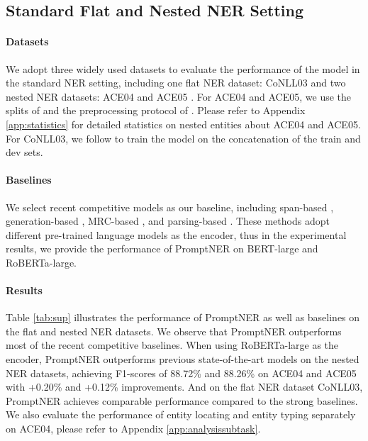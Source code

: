 \documentclass[11pt]{article}
\begin{document}
\subsection{Standard Flat and Nested NER Setting}
\label{flatnested}

\paragraph{Datasets} We adopt three widely used datasets to evaluate the performance of the model in the standard NER setting, including one flat NER dataset: CoNLL03 \citep{tjong-kim-sang-de-meulder-2003-introduction} and two nested NER datasets: ACE04 \citep{ doddington-etal-2004-automatic} and ACE05 \citep{2005-automatic}. For ACE04 and ACE05, we use the splits of \citet{lu-roth-2015-joint,muis-lu-2017-labeling} and the preprocessing protocol of \citet{shibuya-hovy-2020-nested}. Please refer to Appendix \ref{app:statistics} for detailed statistics on nested entities about ACE04 and ACE05. For CoNLL03, we follow \citet{lample-etal-2016-neural,yu-etal-2020-named, 10.1007/978-3-031-30675-4_31} to train the model on the concatenation of the train and dev sets.

\paragraph{Baselines} We select recent competitive models as our baseline, including span-based \citep{yuan-etal-2022-fusing, li2022unified}, generation-based \citep{ijcai2021-542, yan-etal-2021-unified-generative, lu-etal-2022-unified}, MRC-based \citep{li-etal-2020-unified,shen-etal-2022-parallel, jwq2022rcekgqa}, and parsing-based \citep{yu-etal-2020-named, zhu-li-2022-boundary, lou-etal-2022-nested, yang-tu-2022-bottom}. These methods adopt different pre-trained language models as the encoder, thus in the experimental results, we provide the performance of PromptNER on BERT-large and RoBERTa-large.

\paragraph{Results}


Table \ref{tab:sup} illustrates the performance of PromptNER as well as baselines on the flat and nested NER datasets. We observe that PromptNER outperforms most of the recent competitive baselines. When using RoBERTa-large as the encoder, PromptNER outperforms previous state-of-the-art models on the nested NER datasets, achieving F1-scores of 88.72\% and 88.26\% on ACE04 and ACE05 with +0.20\% and +0.12\% improvements. And on the flat NER dataset CoNLL03, PromptNER achieves comparable performance compared to the strong baselines. We also evaluate the performance of entity locating and entity typing separately on ACE04, please refer to Appendix \ref{app:analysissubtask}.
\end{document}
